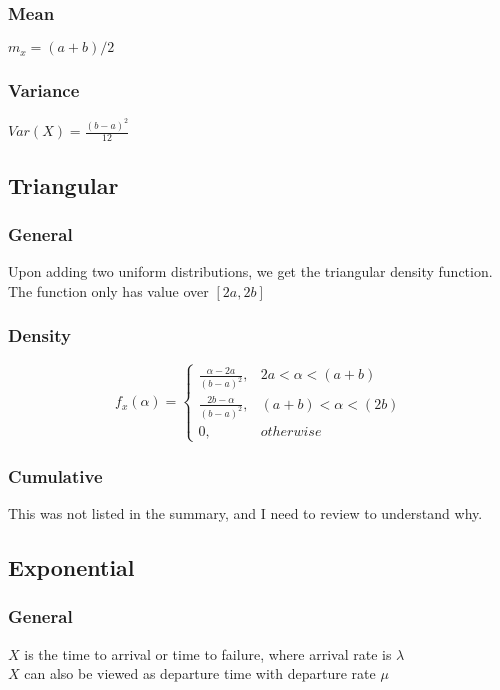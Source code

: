 \subsubsection*{Mean}
$m_x=(a+b)/2 $ 

\subsubsection*{Variance}
$Var(X)=\frac{(b-a)^2}{12}$
    

\subsection*{Triangular }

\subsubsection*{General}
Upon adding two uniform distributions, we get the triangular density function. The function only has value over $[2a,2b]$

\subsubsection*{Density}
\[ f_x(\alpha)=
  \begin{cases} 
    \frac{\alpha-2a}{(b-a)^2}, & 2a<\alpha<(a+b) \\
    \frac{2b-\alpha}{(b-a)^2}, & (a+b)<\alpha<(2b) \\
    0,                         & otherwise
  \end{cases}
\]

\subsubsection*{Cumulative }
This was not listed in the summary, and I need to review to understand why.
    

\subsection*{Exponential }

\subsubsection*{General}
$X$ is the time to arrival or time to failure, where arrival rate is $\lambda$ \\
$X$ can also be viewed as departure time with departure rate $\mu$

